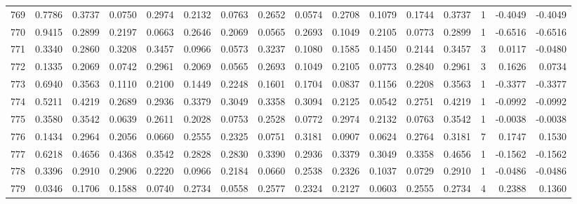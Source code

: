 \begin{tabular}{lrrrrrrrrrrrrrrr}
769 &      0.7786 &  0.3737 &  0.0750 &  0.2974 &  0.2132 &  0.0763 &  0.2652 &  0.0574 &  0.2708 &  0.1079 &   0.1744 &     0.3737 &      1 &                   -0.4049 &                    -0.4049 \\
770 &      0.9415 &  0.2899 &  0.2197 &  0.0663 &  0.2646 &  0.2069 &  0.0565 &  0.2693 &  0.1049 &  0.2105 &   0.0773 &     0.2899 &      1 &                   -0.6516 &                    -0.6516 \\
771 &      0.3340 &  0.2860 &  0.3208 &  0.3457 &  0.0966 &  0.0573 &  0.3237 &  0.1080 &  0.1585 &  0.1450 &   0.2144 &     0.3457 &      3 &                    0.0117 &                    -0.0480 \\
772 &      0.1335 &  0.2069 &  0.0742 &  0.2961 &  0.2069 &  0.0565 &  0.2693 &  0.1049 &  0.2105 &  0.0773 &   0.2840 &     0.2961 &      3 &                    0.1626 &                     0.0734 \\
773 &      0.6940 &  0.3563 &  0.1110 &  0.2100 &  0.1449 &  0.2248 &  0.1601 &  0.1704 &  0.0837 &  0.1156 &   0.2208 &     0.3563 &      1 &                   -0.3377 &                    -0.3377 \\
774 &      0.5211 &  0.4219 &  0.2689 &  0.2936 &  0.3379 &  0.3049 &  0.3358 &  0.3094 &  0.2125 &  0.0542 &   0.2751 &     0.4219 &      1 &                   -0.0992 &                    -0.0992 \\
775 &      0.3580 &  0.3542 &  0.0639 &  0.2611 &  0.2028 &  0.0753 &  0.2528 &  0.0772 &  0.2974 &  0.2132 &   0.0763 &     0.3542 &      1 &                   -0.0038 &                    -0.0038 \\
776 &      0.1434 &  0.2964 &  0.2056 &  0.0660 &  0.2555 &  0.2325 &  0.0751 &  0.3181 &  0.0907 &  0.0624 &   0.2764 &     0.3181 &      7 &                    0.1747 &                     0.1530 \\
777 &      0.6218 &  0.4656 &  0.4368 &  0.3542 &  0.2828 &  0.2830 &  0.3390 &  0.2936 &  0.3379 &  0.3049 &   0.3358 &     0.4656 &      1 &                   -0.1562 &                    -0.1562 \\
778 &      0.3396 &  0.2910 &  0.2906 &  0.2220 &  0.0966 &  0.2184 &  0.0660 &  0.2538 &  0.2326 &  0.1037 &   0.0729 &     0.2910 &      1 &                   -0.0486 &                    -0.0486 \\
779 &      0.0346 &  0.1706 &  0.1588 &  0.0740 &  0.2734 &  0.0558 &  0.2577 &  0.2324 &  0.2127 &  0.0603 &   0.2555 &     0.2734 &      4 &                    0.2388 &                     0.1360 \\

\end{tabular}
